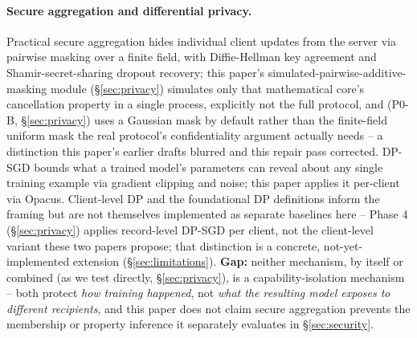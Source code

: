 \documentclass[11pt]{article}
\begin{document}
\paragraph{Secure aggregation and differential privacy.} Practical secure
aggregation \citep{bonawitz2017secagg} hides individual client updates from
the server via pairwise masking over a finite field, with Diffie-Hellman
key agreement and Shamir-secret-sharing dropout recovery; this paper's
simulated-pairwise-additive-masking module (\S\ref{sec:privacy}) simulates
only that mathematical core's cancellation property in a single process,
explicitly not the full protocol, and (P0-B, \S\ref{sec:privacy}) uses a
Gaussian mask by default rather than the finite-field uniform mask the
real protocol's confidentiality argument actually needs -- a distinction
this paper's earlier drafts blurred and this repair pass corrected. DP-SGD
\citep{abadi2016deep} bounds what a trained model's parameters can reveal
about any single training example via gradient clipping and noise; this
paper applies it per-client via Opacus. Client-level DP
\citep{geyer2017differentially,mcmahan2018learning} and the foundational DP
definitions \citep{dwork2014algorithmic} inform the framing but are not
themselves implemented as separate baselines here -- Phase 4
(\S\ref{sec:privacy}) applies record-level DP-SGD per client, not the
client-level variant these two papers propose; that distinction is a
concrete, not-yet-implemented extension (\S\ref{sec:limitations}).
\textbf{Gap:} neither mechanism, by itself or combined (as we test
directly, \S\ref{sec:privacy}), is a capability-isolation mechanism -- both
protect \emph{how training happened}, not \emph{what the resulting model
exposes to different recipients}, and this paper does not claim secure
aggregation prevents the membership or property inference it separately
evaluates in \S\ref{sec:security}.
\end{document}
